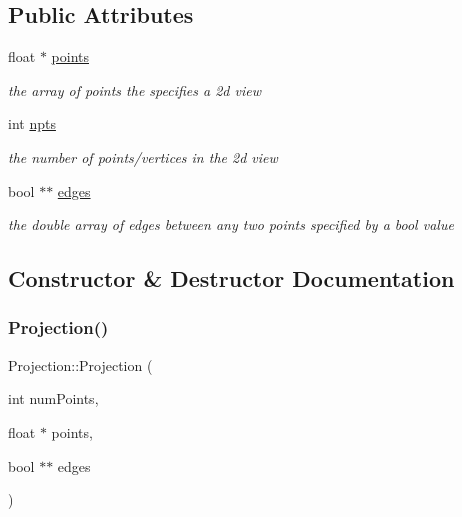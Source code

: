 \subsection*{Public Attributes}
\begin{DoxyCompactItemize}
\item 
float $\ast$ \mbox{\hyperlink{class_projection_aa42ba5494690dbfa5f875472adc97789}{points}}
\begin{DoxyCompactList}\small\item\em the array of points the specifies a 2d view \end{DoxyCompactList}\item 
int \mbox{\hyperlink{class_projection_a6972ab0bc1cfa26a5480a940d66e3497}{npts}}
\begin{DoxyCompactList}\small\item\em the number of points/vertices in the 2d view \end{DoxyCompactList}\item 
bool $\ast$$\ast$ \mbox{\hyperlink{class_projection_a7943c696e88d15825dee0641b269b5f7}{edges}}
\begin{DoxyCompactList}\small\item\em the double array of edges between any two points specified by a bool value \end{DoxyCompactList}\end{DoxyCompactItemize}


\subsection{Constructor \& Destructor Documentation}
\mbox{\label{class_projection_a5308ac2fb97e9805c76e3cf767f08a0e}} 
\subsubsection{\texorpdfstring{Projection()}{Projection()}}
{\footnotesize\ttfamily Projection\+::\+Projection (\begin{DoxyParamCaption}\item[{int}]{num\+Points,  }\item[{float $\ast$}]{points,  }\item[{bool $\ast$$\ast$}]{edges }\end{DoxyParamCaption})}




